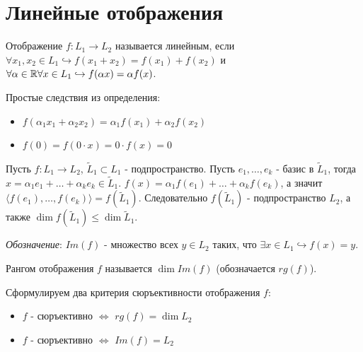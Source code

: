 \section{Линейные отображения}
\begin{definition}
    Отображение $f:L_1 \rightarrow L_2$ называется линейным, если $\forall x_1, x_2 \in L_1 \hookrightarrow f(x_1+x_2)=f(x_1)+f(x_2)$ и $\forall \alpha \in \mathbb{R} \forall x \in L_1 \hookrightarrow f(\alpha x)=\alpha f(x)$.
\end{definition}
Простые следствия из определения:
\begin{itemize}
    \item $f(\alpha_1 x_1 + \alpha_2 x_2)=\alpha_1 f(x_1)+\alpha_2 f(x_2)$
    \item $f(0)=f(0\cdot x)=0\cdot f(x)=0$
\end{itemize}

Пусть $f:L_1 \rightarrow L_2$, $\tilde{L}_1 \subset L_1$ - подпространство.
Пусть $e_1, \dots, e_k$ - базис в $\tilde{L}_1$, тогда $x=\alpha_1 e_1 + \dots + \alpha_k e_k \in \tilde{L}_1$. $f(x)=\alpha_1 f(e_1) + \dots + \alpha_k f(e_k)$, а значит $\langle f(e_1), \dots, f(e_k) \rangle = f(\tilde{L}_1)$. Следовательно $f(\tilde{L}_1)$ - подпространство $L_2$, а также $\dim f(\tilde{L}_1) \leqslant \dim \tilde{L}_1$.

\textit{Обозначение}: $Im (f)$ - множество всех $y \in L_2$ таких, что $\exists x\in L_1 \hookrightarrow f(x)=y$.

\begin{definition}
    \label{conseq}
    Рангом отображения $f$ называется $\dim Im(f)$ (обозначается $rg(f)$).
\end{definition}

Сформулируем два критерия сюръективности отображения $f$:
\begin{itemize}
    \item $f$ - сюръективно $\Leftrightarrow$ $rg(f)=\dim L_2$
    \item $f$ - сюръективно $\Leftrightarrow$ $Im(f) = L_2$
\end{itemize}
